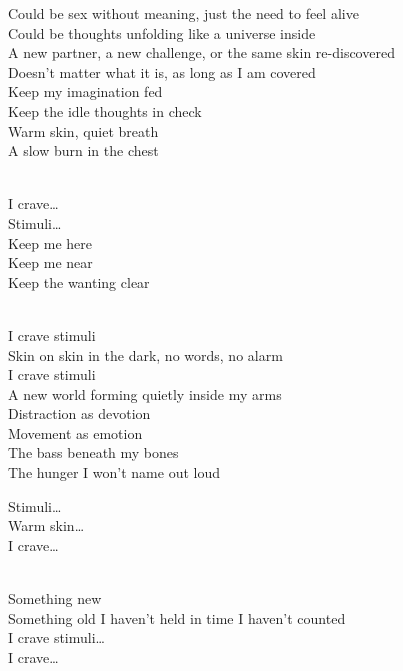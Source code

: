 \begin{lyrics}
Could be sex without meaning, just the need to feel alive\\
Could be thoughts unfolding like a universe inside\\
A new partner, a new challenge, or the same skin re-discovered\\
Doesn’t matter what it is, as long as I am covered\\
Keep my imagination fed\\
Keep the idle thoughts in check\\
Warm skin, quiet breath\\
A slow burn in the chest

\\
I crave…\\
Stimuli…\\
Keep me here\\
Keep me near\\
Keep the wanting clear

\\
I crave stimuli\\
Skin on skin in the dark, no words, no alarm\\
I crave stimuli\\
A new world forming quietly inside my arms\\
Distraction as devotion\\
Movement as emotion\\
The bass beneath my bones\\
The hunger I won’t name out loud

Stimuli…\\
Warm skin…\\
I crave…

\\
Something new\\
Something old I haven’t held in time I haven’t counted\\
I crave stimuli…\\
I crave…
\end{lyrics}

